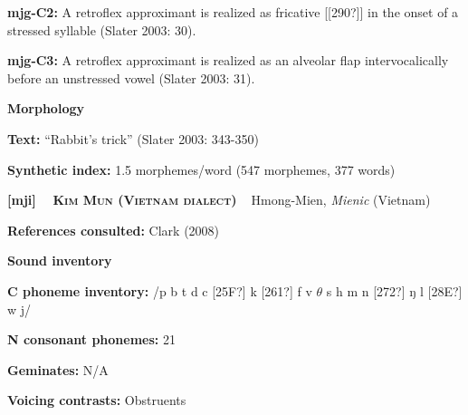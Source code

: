 \begin{styleBody}
\textbf{mjg-C2: }A retroflex approximant is realized as fricative [[290?]] in the onset of a stressed syllable (Slater 2003: 30).
\end{styleBody}

\begin{styleBody}
\textbf{mjg-C3: }A retroflex approximant is realized as an alveolar flap intervocalically before an unstressed vowel (Slater 2003: 31).
\end{styleBody}

\begin{styleBody}
\textbf{Morphology}
\end{styleBody}

\begin{styleBody}
\textbf{Text: }“Rabbit’s trick” (Slater 2003: 343-350)
\end{styleBody}

\begin{styleBody}
\textbf{Synthetic index: }1.5 morphemes/word (547 morphemes, 377 words)
\end{styleBody}

\clearpage\begin{styleBody}
\textbf{[mji] }\ \ \textbf{\textsc{Kim Mun (Vietnam dialect)}}\textbf{\ \ }Hmong-Mien, \textit{Mienic} (Vietnam)
\end{styleBody}

\begin{styleBody}
\textbf{References consulted: }Clark (2008)
\end{styleBody}

\begin{styleBody}
\textbf{Sound inventory}
\end{styleBody}

\begin{styleBody}
\textbf{C phoneme inventory:} /p b t d c [25F?] k [261?] f v $\theta $ s h m n [272?] ŋ l [28E?] w j/
\end{styleBody}

\begin{styleBody}
\textbf{N consonant phonemes:} 21
\end{styleBody}

\begin{styleBody}
\textbf{Geminates:} N/A
\end{styleBody}

\begin{styleBody}
\textbf{Voicing contrasts:} Obstruents
\end{styleBody}

